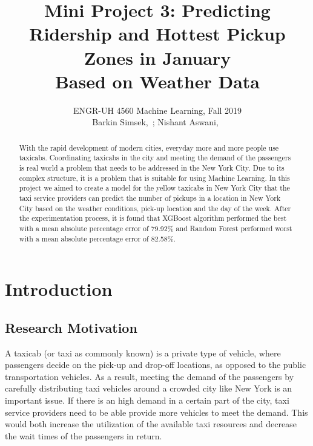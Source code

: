 \documentclass[journal, 12pt]{IEEEtran}
\begin{document}
{}
\setcounter{page}{1}

\title{{\large Mini Project 3: Predicting Ridership and Hottest Pickup Zones in January \\ Based on Weather Data}}

\author{ENGR-UH 4560 Machine Learning, Fall 2019\\
\medskip
Barkin Simsek,~;
Nishant Aswani,~}%


%
{}

\maketitle

\begin{abstract}
With the rapid development of modern cities, everyday more and more people use taxicabs. Coordinating taxicabs in the city and meeting the demand of the passengers is real world a problem that needs to be addressed in the New York City. Due to its complex structure, it is a problem that is suitable for using Machine Learning. In this project we aimed to create a model for the yellow taxicabs in New York City that the taxi service providers can predict the number of pickups in a location in New York City based on the weather conditions, pick-up location and the day of the week. After the experimentation process, it is found that XGBoost algorithm performed the best with a mean absolute percentage error of 79.92\% and Random Forest performed worst with a mean absolute percentage error of 82.58\%.


\end{abstract}

\section{Introduction}
\subsection{Research Motivation}
\noindent A taxicab (or taxi as commonly known) is a private type of vehicle, where passengers decide on the pick-up and drop-off locations, as opposed to the public transportation vehicles. As a result, meeting the demand of the passengers by carefully distributing taxi vehicles around a crowded city like New York is an important issue. If there is an high demand in a certain part of the city, taxi service providers need to be able provide more vehicles to meet the demand. This would both increase the utilization of the available taxi resources and decrease the wait times of the passengers in return.\\ 
\end{document}

